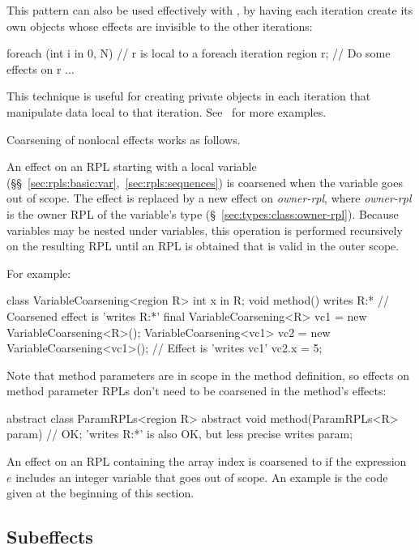 This pattern can also be used effectively with , by
having each iteration create its own objects whose effects are
invisible to the other iterations:
%
\begin{dpjlisting}
foreach (int i in 0, N) {
  // r is local to a foreach iteration
  region r;
  // Do some effects on r
  ...
}
\end{dpjlisting}
%
This technique is useful for creating private objects in each
iteration that manipulate data local to that iteration.  See
\tutorial\ for more examples.

 Coarsening of nonlocal
effects works as follows.

 An effect on an RPL starting with a
 local variable
(\S\S~\ref{sec:rpls:basic:var},~\ref{sec:rpls:sequences}) is coarsened
when the variable goes out of scope.  The effect is replaced by a new
effect on \emph{owner-rpl}\kwd{:*}, where \emph{owner-rpl} is the
owner RPL of the variable's type (\S~\ref{sec:types:class:owner-rpl}).
Because variables may be nested under variables, this operation is
performed recursively on the resulting RPL until an RPL is obtained
that is valid in the outer scope.

For example:
%
\begin{dpjlisting}
class VariableCoarsening<region R> {
  int x in R;
  void method() 
    writes R:* 
  {
    // Coarsened effect is 'writes R:*'
    {
      final VariableCoarsening<R> vc1 = 
        new VariableCoarsening<R>();
      VariableCoarsening<vc1> vc2 =
        new VariableCoarsening<vc1>();
      // Effect is 'writes vc1'
      vc2.x = 5;
    }
  }
}
\end{dpjlisting}

Note that method parameters are in scope in the method definition, so
effects on method parameter RPLs don't need to be coarsened in the
method's effects:
%
\begin{dpjlisting}
abstract class ParamRPLs<region R> {
  abstract void method(ParamRPLs<R> param)
    // OK; 'writes R:*' is also OK, but less precise
    writes param;
}
\end{dpjlisting}

 An effect on an RPL containing the array
index \kwd{[$e$]} is coarsened to \kwd{[?]} if the expression $e$
includes an integer variable that goes out of scope.  An example is
the  code given at the beginning of this section.

\subsection{Subeffects%
\label{sec:effects:subeffects}}

